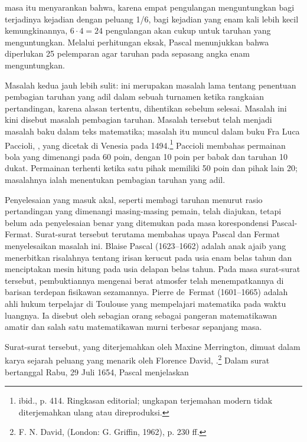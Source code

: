 masa itu menyarankan bahwa, karena empat pengulangan menguntungkan bagi terjadinya
kejadian dengan peluang 1/6, bagi kejadian yang enam kali lebih kecil kemungkinannya, $6 \cdot 4 =
24$ pengulangan akan cukup untuk taruhan yang menguntungkan.  Melalui
perhitungan eksak, Pascal menunjukkan bahwa diperlukan 25 pelemparan agar taruhan pada sepasang
angka enam menguntungkan.
\par
Masalah kedua jauh lebih sulit: ini merupakan masalah lama tentang
penentuan pembagian taruhan yang adil dalam sebuah turnamen ketika
rangkaian pertandingan, karena alasan tertentu, dihentikan sebelum selesai.  Masalah ini
kini disebut masalah pembagian taruhan.  Masalah tersebut
telah menjadi masalah baku dalam teks matematika; masalah itu muncul dalam buku Fra Luca
Paccioli, , yang dicetak di Venesia pada 1494.\footnote{ibid., p. 414.
Ringkasan editorial; ungkapan terjemahan modern tidak diterjemahkan ulang atau
direproduksi.} Paccioli membahas permainan bola yang dimenangi pada 60 poin,
dengan 10 poin per babak dan taruhan 10 dukat. Permainan terhenti ketika satu
pihak memiliki 50 poin dan pihak lain 20; masalahnya ialah menentukan pembagian
taruhan yang adil.
\par
Penyelesaian yang masuk akal, seperti membagi taruhan menurut rasio
pertandingan yang dimenangi masing-masing pemain, telah diajukan, tetapi belum ada penyelesaian benar yang
ditemukan pada masa korespondensi Pascal-Fermat. 
Surat-surat tersebut terutama membahas upaya Pascal dan Fermat menyelesaikan masalah ini.  Blaise
Pascal (1623--1662) adalah anak ajaib yang menerbitkan
risalahnya tentang irisan kerucut pada usia enam belas tahun dan menciptakan mesin
hitung pada usia delapan belas tahun.  Pada masa surat-surat tersebut, pembuktiannya mengenai berat
atmosfer telah menempatkannya di barisan terdepan
fisikawan sezamannya.  Pierre de~Fermat (1601--1665) adalah ahli hukum terpelajar di
Toulouse yang mempelajari matematika pada waktu luangnya.  Ia disebut oleh sebagian orang sebagai pangeran
matematikawan amatir dan salah satu matematikawan murni terbesar sepanjang masa.
\par
Surat-surat tersebut, yang diterjemahkan oleh Maxine Merrington, dimuat dalam karya sejarah peluang
yang menarik oleh Florence David, .\footnote{F. N.
David,  (London: G. Griffin, 1962), p. 230
ff.}  Dalam surat bertanggal Rabu, 29 Juli 1654, Pascal menjelaskan
